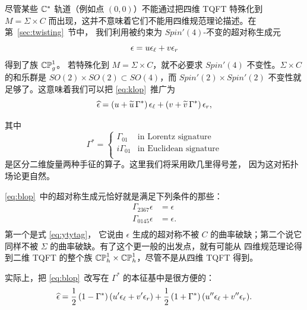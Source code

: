 尽管某些 $\Bbb{C}^*$ 轨道（例如点 $(0,0)$）不能通过把四维 TQFT 特殊化到
$M=\Sigma\times C$ 而出现，这并不意味着它们不能用四维规范理论描述。在第~\ref{sec:twisting}~节中，
我们利用被约束为 $Spin'(4)$-不变的超对称生成元 %
\setcounter{equation}{12}
\begin{equation}\label{eq:klop}
\epsilon=u\epsilon_\ell+v\epsilon_\rr
\end{equation}
 得到了族 $\Bbb{CP}^1_g$。
若特殊化到
$M=\Sigma\times C$，就不必要求 $Spin'(4)$
不变性。$\Sigma\times C$ 的和乐群是
$SO(2)\times SO(2)\subset SO(4)$，而 $Spin'(2)\times Spin'(2)$
不变性就足够了。这意味着我们可以把 \eqref{eq:klop}\ 推广为
\setcounter{equation}{13}
\begin{equation}\label{eq:blop}
\hat\epsilon=\left(u+\tilde u\,
\Gamma^*\right)\epsilon_\ell
                 +\left(v+\tilde v\,\Gamma^*\right)\epsilon_\rr,
\end{equation}

                其中
\setcounter{equation}{14}
\begin{equation}\label{eq:ujbyty}
\Gamma^*=\begin{cases}\Gamma_{01}&\text{in Lorentz
signature}\\ i\Gamma_{01}&\text{in Euclidean signature}\\\end{cases}
\end{equation}
 是区分二维旋量两种手征的算子。这里我们将采用欧几里得号差，
因为这对拓扑场论更自然。

\eqref{eq:blop}\ 中的超对称生成元恰好就是满足下列条件的那些：
\setcounter{equation}{15}
\begin{equation}\label{eq:zonop}
\begin{aligned}\Gamma_{2367}\epsilon& = \epsilon \\
\Gamma_{0145}\epsilon & = \epsilon.\\\end{aligned}
\end{equation}
 第一个是式 \eqref{eq:ytytag}，
它说由 $\epsilon$ 生成的超对称不被 $C$ 的曲率破缺；第二个说它
同样不被 $\Sigma$ 的曲率破缺。有了这个更一般的出发点，就有可能从
四维规范理论得到二维 TQFT 的整个族
$\Bbb{CP}_h^1\times \Bbb{CP}_h^1$，尽管不是从四维
TQFT 得到。

实际上，把 \eqref{eq:blop}\ 改写在 $\Gamma^*$ 的本征基中是很方便的：
\setcounter{equation}{16}
\begin{equation}\label{eq:bilop}
\hat\epsilon=\half\left(1-\Gamma^*\right)(u'\epsilon_\ell+v'\epsilon_r)
+\half\left(1+\Gamma^*\right)(u''\epsilon_\ell+v''\epsilon_r).
\end{equation}

